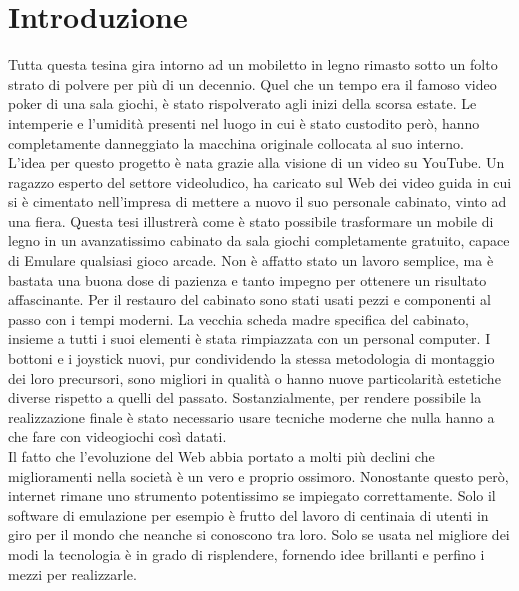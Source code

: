 \chapter*{Introduzione}
Tutta questa tesina gira intorno ad un mobiletto in legno rimasto sotto un folto strato di polvere per più di un decennio. Quel che un tempo era il famoso video poker di una sala giochi, è stato rispolverato agli inizi della scorsa estate. Le intemperie e l’umidità presenti nel luogo in cui è stato custodito però, hanno completamente danneggiato la macchina originale collocata al suo interno.\\ L’idea per questo progetto è nata grazie alla visione di un video su YouTube. Un ragazzo esperto del settore videoludico, ha caricato sul Web dei video guida in cui si è cimentato nell’impresa di mettere a nuovo il suo personale cabinato, vinto ad una fiera. Questa tesi illustrerà come è stato possibile trasformare un mobile di legno in un avanzatissimo cabinato da sala giochi completamente gratuito, capace di \gls{Emulare} qualsiasi gioco arcade. Non è affatto stato un lavoro semplice, ma è bastata una buona dose di pazienza e tanto impegno per ottenere un risultato affascinante. Per il restauro del cabinato sono stati usati pezzi e componenti al passo con i tempi moderni. La vecchia scheda madre specifica del cabinato, insieme a tutti i suoi elementi è stata rimpiazzata con un personal computer. I bottoni e i joystick nuovi, pur condividendo la stessa metodologia di montaggio dei loro precursori, sono migliori in qualità o hanno nuove particolarità estetiche diverse rispetto a quelli del passato. Sostanzialmente, per rendere possibile la realizzazione finale è stato necessario usare tecniche moderne che nulla hanno a che fare con videogiochi così datati.\\Il fatto che l’evoluzione del Web abbia portato a molti più declini che miglioramenti nella società è un vero e proprio ossimoro. Nonostante questo però, internet rimane uno strumento potentissimo se impiegato correttamente. Solo il software di emulazione per esempio è frutto del lavoro di centinaia di utenti in giro per il mondo che neanche si conoscono tra loro. Solo se usata nel migliore dei modi la tecnologia è in grado di risplendere, fornendo idee brillanti e perfino i mezzi per realizzarle.

